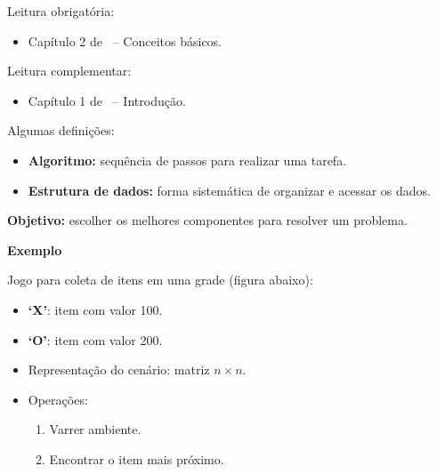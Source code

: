 \newcommand{\defs}{../defs}


\newcommand{\content}{Introdução}
\newcommand{\class}{Algoritmos e Estruturas de Dados}
\newcommand{\shortcourse}{45EST}



\makeheader

Leitura obrigatória:
\begin{itemize}
	\item Capítulo 2 de~\cite{EdelweissAndGalante2009} -- Conceitos básicos.
\end{itemize}
Leitura complementar:
\begin{itemize}
	\item Capítulo 1 de~\cite{Pereira2008} -- Introdução.
\end{itemize}

\medskip


Algumas definições:
\begin{itemize}
	\item \textbf{Algoritmo:} sequência de passos para realizar uma tarefa.
	\item \textbf{Estrutura de dados:} forma sistemática de organizar e acessar os dados.
\end{itemize}

\textbf{Objetivo:} escolher os melhores componentes para resolver um problema.

\medskip

\textbf{Exemplo}

Jogo para coleta de itens em uma grade (figura abaixo):
\begin{itemize}
	\item \textbf{`X'}: item com valor 100.
	\item \textbf{`O'}: item com valor 200.
	\item Representação do cenário: matriz $n \times n$.
	\item Operações:
	\begin{enumerate}
		\item Varrer ambiente.
		\item Encontrar o item mais próximo.
	\end{enumerate}
\end{itemize}

